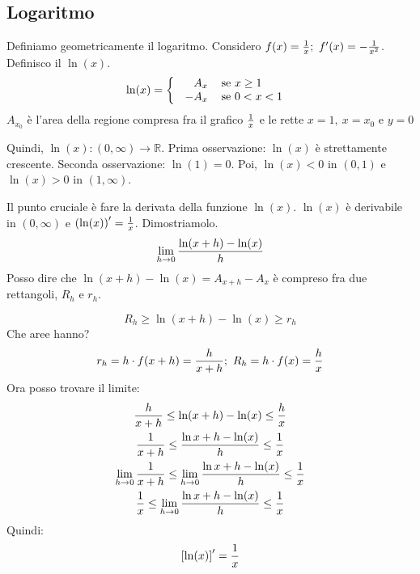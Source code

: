 \documentclass[12pt,a4paper]{article}
\begin{document}
\subsection{Logaritmo}
Definiamo geometricamente il logaritmo.
Considero $f(x) = {1 \over x}; \ f'(x) = -{1 \over x^2}$.
Definisco il $\ln(x)$.
$$ \ln(x) = \left\{ \text{
\begin{tabular}{r l}
$A_x$ & se $x \geq 1$ \\
$-A_x$ & se $0 < x < 1$ \\
\end{tabular}
} \right. $$
$A_{x_0}$ \`e l'area della regione compresa fra il grafico ${1 \over x}$
e le rette $x = 1, \ x = x_0$ e $y = 0$

\begin{center}
\end{center}

Quindi, $\ln(x) : (0, \infty) \to \mathbb{R}$. Prima osservazione: 
$\ln(x)$ \`e strettamente crescente. Seconda osservazione: 
$\ln(1) = 0$. Poi, $\ln(x) < 0$ in $(0,1)$ e $\ln(x)>0$ in $(1,\infty)$.

Il punto cruciale \`e fare la derivata della funzione $\ln(x)$.
$\ln(x)$ \`e derivabile in $(0,\infty)$ e $\left( \ln(x) \right)' =
{1 \over x}$. Dimostriamolo.
$$ \lim_{h \to 0} {\ln(x+h) - \ln(x) \over h} $$
Posso dire che $\ln(x+h) - \ln(x) = A_{x+h} - A_x$ \`e compreso
fra due rettangoli, $R_h$ e $r_h$.

\begin{center}
\end{center}

$$ R_h \geq \ln(x+h) - \ln(x) \geq r_h $$
Che aree hanno? 
$$r_h = h \cdot f(x+h) = {h \over x+h} ; \
 R_h = h \cdot f(x) = {h \over x} $$
Ora posso trovare il limite:
\begin{multline}
{h \over x+h} \leq \ln(x+h) - \ln(x) \leq {h \over x} \\
{1 \over x+h} \leq {\ln{x+h} - \ln(x) \over h} \leq {1 \over x} \\
\lim_{h \to 0} {1 \over x+h} \leq \lim_{h \to 0} {\ln{x+h} - \ln(x) \over h}
\leq {1 \over x} \\
{1 \over x} \leq \lim_{h \to 0} {\ln{x+h} - \ln(x) \over h}
\leq {1 \over x}
\end{multline}
Quindi:
$$ \left[ \ln(x) \right]' = {1 \over x} $$
\end{document}
